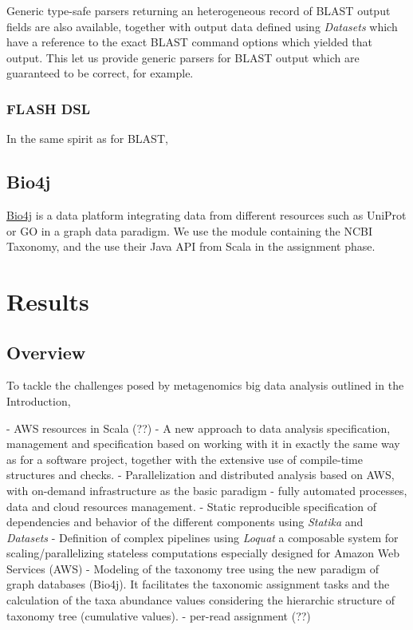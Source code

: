 \documentclass{frontiersSCNS} %
\begin{document}
Generic type-safe parsers returning an heterogeneous record of BLAST
output fields are also available, together with output data defined
using \emph{Datasets} which have a reference to the exact BLAST command
options which yielded that output. This let us provide generic parsers
for BLAST output which are guaranteed to be correct, for example.

\subsubsection{FLASH DSL}\label{flash-dsl}

In the same spirit as for BLAST,

\subsection{Bio4j}\label{bio4j}

\href{https://github.com/bio4j/bio4j}{Bio4j} is a data platform
integrating data from different resources such as UniProt or GO in a
graph data paradigm. We use the module containing the NCBI Taxonomy, and
the use their Java API from Scala in the assignment phase.

\section{Results}\label{results}

\subsection{Overview}\label{overview}

To tackle the challenges posed by metagenomics big data analysis
outlined in the Introduction,

­- AWS resources in Scala (??) - A new approach to data analysis
specification, management and specification based on working with it in
exactly the same way as for a software project, together with the
extensive use of compile-time structures and checks. - Parallelization
and distributed analysis based on AWS, with on-demand infrastructure as
the basic paradigm ­- fully automated processes, data and cloud
resources management. - Static reproducible specification of
dependencies and behavior of the different components using
\emph{Statika} and \emph{Datasets} - Definition of complex pipelines
using \emph{Loquat} a composable system for scaling/parallelizing
stateless computations especially designed for Amazon Web Services (AWS)
- Modeling of the taxonomy tree using the new paradigm of graph
databases (Bio4j). It facilitates the taxonomic assignment tasks and the
calculation of the taxa abundance values considering the hierarchic
structure of taxonomy tree (cumulative values). - per-read assignment
(??)
\end{document}
